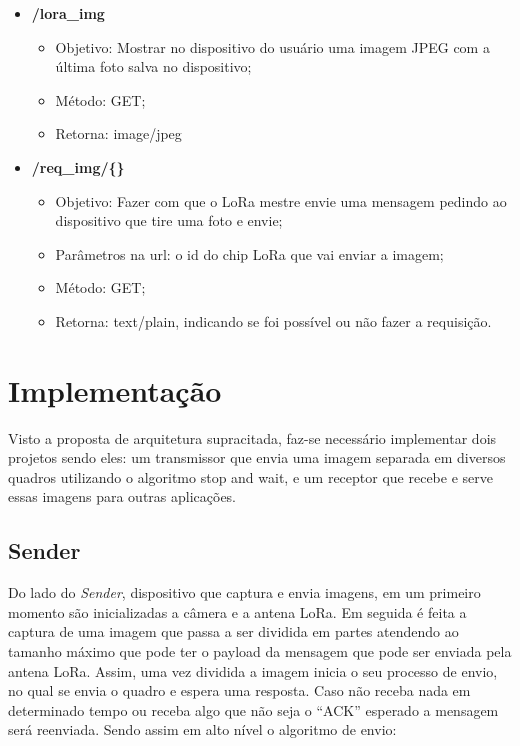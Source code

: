 \documentclass[
article,			%
12pt,				%
oneside,			%
a4paper,			%
english,			%
brazil,				%
sumario=tradicional
]{abntex2}
\begin{document}
\begin{itemize}
    \item\textbf{/lora\_img}
        \begin{itemize}
            \item Objetivo: Mostrar no dispositivo do usuário uma imagem JPEG com a última foto salva no dispositivo;
            \item Método: GET;
            \item Retorna: image/jpeg
        \end{itemize}
    \item\textbf{/req\_img/\{\}}
        \begin{itemize}
            \item Objetivo: Fazer com que o LoRa mestre envie uma mensagem pedindo ao dispositivo que tire uma foto e envie;
            \item Parâmetros na url: o id do chip LoRa que vai enviar a imagem;
            \item Método: GET;
            \item Retorna: text/plain, indicando se foi possível ou não fazer a requisição.
        \end{itemize}
\end{itemize}

\section{Implementação}\label{Implementação}

Visto a proposta de arquitetura supracitada, faz-se necessário implementar dois projetos sendo eles: um transmissor que envia uma imagem separada em diversos quadros utilizando o algoritmo stop and wait, e um receptor que recebe e serve essas imagens para outras aplicações.

\subsection{Sender}\label{Sender}
Do lado do \textit{Sender}, dispositivo que captura e envia imagens, em um primeiro momento são inicializadas a câmera e a antena LoRa. Em seguida é feita a captura de uma imagem que passa a ser dividida em partes atendendo ao tamanho máximo que pode ter o payload da mensagem que pode ser enviada pela antena LoRa. Assim, uma vez dividida a imagem inicia o seu processo de envio, no qual se envia o quadro e espera uma resposta. Caso não receba nada em determinado tempo ou receba algo que não seja o ``ACK'' esperado a mensagem será reenviada. Sendo assim em alto nível o algoritmo de envio:
\end{document}

